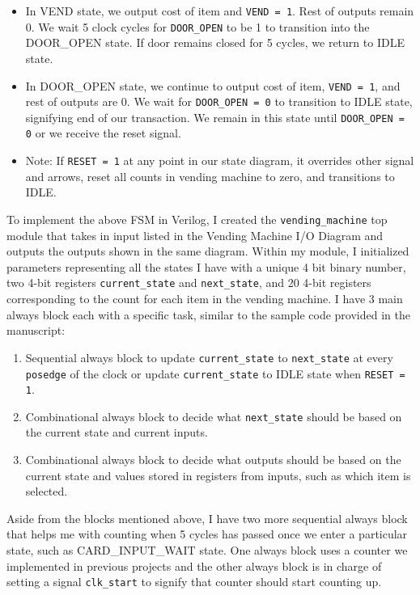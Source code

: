 \documentclass{article}
\begin{document}
\begin{itemize}
    \item In VEND state, we output cost of item and \texttt{VEND = 1}. Rest of outputs remain 0. We wait 5 clock cycles for \texttt{DOOR\_OPEN} to be 1 to transition into the DOOR\_OPEN state. If door remains closed for 5 cycles, we return to IDLE state.
    \item In DOOR\_OPEN state, we continue to output cost of item, \texttt{VEND = 1}, and rest of outputs are 0. We wait for \texttt{DOOR\_OPEN = 0} to transition to IDLE state, signifying end of our transaction. We remain in this state until  \texttt{DOOR\_OPEN = 0} or we receive the reset signal. 
    \item Note: If \texttt{RESET = 1} at any point in our state diagram, it overrides other signal and arrows, reset all counts in vending machine to zero, and transitions to IDLE. 
\end{itemize}
To implement the above FSM in Verilog, I created the \texttt{vending\_machine} top module that takes in input listed in the Vending Machine I/O Diagram and outputs the outputs shown in the same diagram. Within my module, I initialized parameters representing all the states I have with a unique 4 bit binary number, two 4-bit registers \texttt{current\_state} and \texttt{next\_state}, and 20 4-bit registers corresponding to the count for each item in the vending machine. I have 3 main always block each with a specific task, similar to the sample code provided in the manuscript:
\begin{enumerate}
    \item Sequential always block to update \texttt{current\_state} to \texttt{next\_state} at every \texttt{posedge} of the clock or update \texttt{current\_state} to IDLE state when \texttt{RESET = 1}.
    \item Combinational always block to decide what \texttt{next\_state} should be based on the current state and current inputs.
    \item Combinational always block to decide what outputs should be based on the current state and values stored in registers from inputs, such as which item is selected.
\end{enumerate}
Aside from the blocks mentioned above, I have two more sequential always block that helps me with counting when 5 cycles has passed once we enter a particular state, such as CARD\_INPUT\_WAIT state. One always block uses a counter we implemented in previous projects and the other always block is in charge of setting a signal \texttt{clk\_start} to signify that counter should start counting up. 
\end{document}
